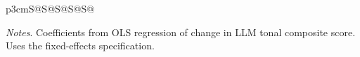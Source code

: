 \begin{table}
\begin{threeparttable}
\begin{tabular}{p{3cm}S@{}S@{}S@{}S@{}S@{}}
            \bottomrule
        \end{tabular}
        \begin{tablenotes}
            \tiny
            \item \textit{Notes}. Coefficients from OLS regression of change in LLM tonal composite score. Uses the fixed-effects specification.
        \end{tablenotes}
    \end{threeparttable}
\end{table}